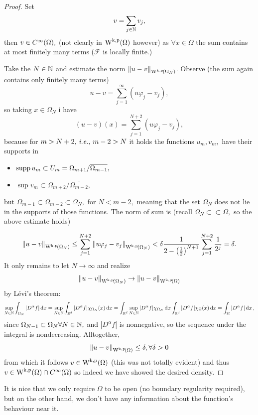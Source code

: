 \documentclass{article}
\begin{document}
\begin{proof}
	Set
	\[
		v = \sum_{j\in {\mathbb N}} v_j,
	\]
	then $v \in C^{\infty}\qty(\Omega),$ (not clearly in $\WkpSet{\Omega}$ however) as $\forall x \in \Omega$ the sum contains at most finitely many terms ($ \mathcal{F}$ is locally finite.)


	Take the $N \in {\mathbb N}$ and estimate the norm $\norm{u-v}_{\WkpSet{\Omega_N}}$. Observe (the sum again contains only finitely many terms)
	\[
		u-v = \sum_{j=1}^\infty(u \varphi_j - v_j),
	\]
	so taking $x \in \Omega_N$ i have
	\[
		(u-v)(x) = \sum_{j=1}^{N+2}(u \varphi_j - v_j),
	\]
		because for $m > N+2, \, \text{\textit{i.e.}}, \, m-2 >N$ it holds the functions $u_m, v_m, $ have their supports in
		\begin{itemize}
			\item $\operatorname{supp} u_m \subset U_m = \Omega_{m+1}/ \overline{\Omega_{m-1}},$
			\item $\sup v_m \subset \Omega_{m+2}/ \overline{\Omega_{m-2}},$
		\end{itemize}
		but $\Omega_{m-1} \subset \Omega_{m-2} \subset \Omega_N,$ for $N < m-2,$ meaning that the set $\Omega_N$ does not lie in the supports of those functions.
	The norm of sum is (recall $\Omega_N \subset \subset \Omega,$ so the above estimate holds)

	\begin{equation*}
		\norm{u-v}_{\WkpSet{\Omega_N}} \leq \sum_{j=1}^{N+2}\norm{u \varphi_j - v_j}_{\WkpSet{\Omega_N}} <\delta \frac{1}{2-\qty(\frac{1}{2})^{N+1}}\sum_{j=1}^{N+2} \frac{1}{2^j} = \delta.
	\end{equation*}
	It only remains to let $N \to \infty$ and realize
	\[
		\norm{u-v}_{\WkpSet{\Omega_N}} \to \norm{u-v}_{\WkpSet{\Omega}}
	\]
	by Lévi's theorem:
	\[
	\sup_{N\in {\mathbb N}}\int_{\Omega_N}|D^\alpha f| \dd{x} = \sup_{N \in {\mathbb N}}\int_{{\mathbb R}^d}|D^{\alpha}f|\chi_{\Omega_N}(x)\dd{x} = \int_{{\mathbb R}^d}\sup_{N \in {\mathbb N}}|D^{\alpha}f| \chi_{\Omega_N}\dd{x} \int_{{\mathbb R}^d}|D^\alpha f|\chi_{\Omega}(x)	\dd{x} = \int_{\Omega}|D^{\alpha}f|\dd{x},
	\]
	since $\Omega_{N-1} \subset \Omega_{N} \forall N \in {\mathbb N},$ and $|D^{\alpha}f|$ is nonnegative, so the sequence under the integral is nondecreasing. Alltogether,
	\[
		\norm{u-v}_{\WkpSet{\Omega}}\leq \delta, \forall \delta>0
	\]
	from which it follows $v \in \WkpSet{\Omega}$ (this was not totally evident) and thus $v \in \WkpSet{\Omega} \cap C^{\infty}\qty(\Omega)$ so indeed we have showed the desired density.
\end{proof}

\begin{remark}
	It is nice that we only require $\Omega$ to be open (no boundary regularity required), but on the other hand, we don't have any information about the function's behaviour near it.
\end{remark}
\end{document}

